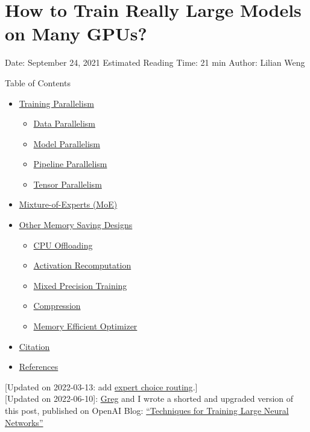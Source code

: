 \section{How to Train Really Large Models on Many GPUs?}\label{how-to-train-really-large-models-on-many-gpus}

Date: September 24, 2021 \textbar{} Estimated Reading Time: 21 min \textbar{} Author: Lilian Weng

{Table of Contents}

\begin{itemize}
\tightlist
\item
  \hyperref[training-parallelism]{Training Parallelism}

  \begin{itemize}
  \tightlist
  \item
    \hyperref[data-parallelism]{Data Parallelism}
  \item
    \hyperref[model-parallelism]{Model Parallelism}
  \item
    \hyperref[pipeline-parallelism]{Pipeline Parallelism}
  \item
    \hyperref[tensor-parallelism]{Tensor Parallelism}
  \end{itemize}
\item
  \hyperref[mixture-of-experts-moe]{Mixture-of-Experts (MoE)}
\item
  \hyperref[other-memory-saving-designs]{Other Memory Saving Designs}

  \begin{itemize}
  \tightlist
  \item
    \hyperref[cpu-offloading]{CPU Offloading}
  \item
    \hyperref[activation-recomputation]{Activation Recomputation}
  \item
    \hyperref[mixed-precision-training]{Mixed Precision Training}
  \item
    \hyperref[compression]{Compression}
  \item
    \hyperref[memory-efficient-optimizer]{Memory Efficient Optimizer}
  \end{itemize}
\item
  \hyperref[citation]{Citation}
\item
  \hyperref[references]{References}
\end{itemize}

{{[}Updated on 2022-03-13: add \hyperref[ec]{expert choice routing}.{]}}\\

{[}Updated on 2022-06-10{]}: \href{https://gregbrockman.com/}{Greg} and I wrote a shorted and upgraded version of this post, published on OpenAI Blog: \href{https://openai.com/blog/techniques-for-training-large-neural-networks/}{``Techniques for Training Large Neural Networks''}

